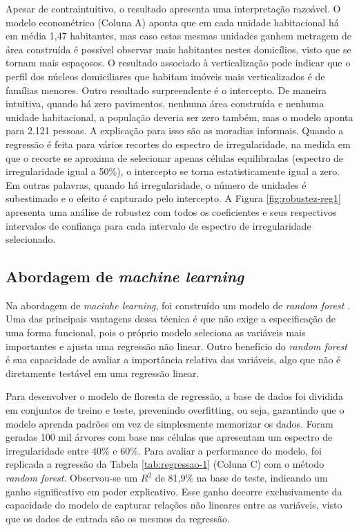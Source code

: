 Apesar de contraintuitivo, o resultado apresenta uma interpretação razoável. O modelo econométrico (Coluna A) aponta que em cada unidade habitacional há em média 1,47 habitantes, mas caso estas mesmas unidades ganhem metragem de área construída é possível observar mais habitantes nestes domicílios, visto que se tornam mais espaçosos. O resultado associado à verticalização pode indicar que o perfil dos núcleos domiciliares que habitam imóveis mais verticalizados é de famílias menores. Outro resultado surpreendente é o intercepto. De maneira intuitiva, quando há zero pavimentos, nenhuma área construída e nenhuma unidade habitacional, a população deveria ser zero também, mas o modelo aponta para 2.121 pessoas. A explicação para isso são as moradias informais. Quando a regressão é feita para vários recortes do espectro de irregularidade, na medida em que o recorte se aproxima de selecionar apenas células equilibradas (espectro de irregularidade igual a 50\%), o intercepto se torna estatisticamente igual a zero. Em outras palavras, quando há irregularidade, o número de unidades é subestimado e o efeito é capturado pelo intercepto. A Figura \ref{fig:robustez-reg1} apresenta uma análise de robustez com todos os coeficientes e seus respectivos intervalos de confiança para cada intervalo de espectro de irregularidade selecionado.

\subsection{Abordagem de \textit{machine learning}}

Na abordagem de \textit{macinhe learning}, foi construído um modelo de \textit{random forest} \cite{wright2015ranger}. Uma das principais vantagens dessa técnica é que não exige a especificação de uma forma funcional, pois o próprio modelo seleciona as variáveis mais importantes e ajusta uma regressão não linear. Outro benefício do \textit{random forest} é sua capacidade de avaliar a importância relativa das variáveis, algo que não é diretamente testável em uma regressão linear.


Para desenvolver o modelo de floresta de regressão, a base de dados foi dividida em conjuntos de treino e teste, prevenindo overfitting, ou seja, garantindo que o modelo aprenda padrões em vez de simplesmente memorizar os dados. Foram geradas 100 mil árvores com base nas células que apresentam um espectro de irregularidade entre 40\% e 60\%. Para avaliar a performance do modelo, foi replicada a regressão da Tabela \ref{tab:regressao-1} (Coluna C) com o método \textit{random forest}. Observou-se um $R^2$ de 81,9\% na base de teste, indicando um ganho significativo em poder explicativo. Esse ganho decorre exclusivamente da capacidade do modelo de capturar relações não lineares entre as variáveis, visto que os dados de entrada são os mesmos da regressão.

